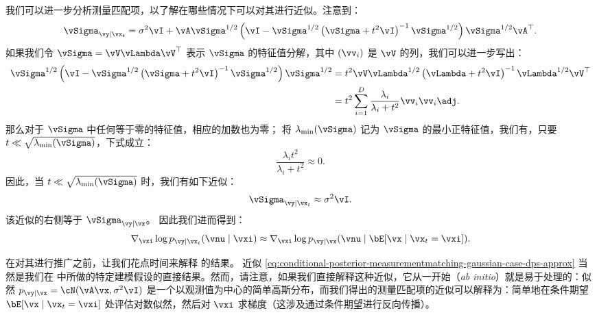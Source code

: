 \documentclass[../../book-main_zh.tex]{subfiles}
\begin{document}
\begin{example}
    我们可以进一步分析测量匹配项，以了解在哪些情况下可以对其进行近似。注意到：
    \begin{equation}
        \vSigma_{\vy \mid \vx_t}
        =
        \sigma^2 \vI + \vA\vSigma^{1/2} \left(
            \vI - \vSigma^{1/2}\left(
                \vSigma + t^2 \vI
            \right)^{-1}
            \vSigma^{1/2}
        \right)\vSigma^{1/2}\vA^\top.
    \end{equation}
    如果我们令 $\vSigma = \vV \vLambda \vV^\top$ 表示 $\vSigma$ 的特征值分解，其中 $(\vv_i)$ 是 $\vV$ 的列，我们可以进一步写出：
    \begin{align}
        \vSigma^{1/2}\left(
            \vI - \vSigma^{1/2}\left(
                \vSigma + t^2 \vI
            \right)^{-1}
            \vSigma^{1/2}
        \right) \vSigma^{1/2}
        &=
        t^2 \vV \vLambda^{1/2}\left(
            \vLambda + t^2 \vI
        \right)^{-1}
        \vLambda^{1/2}
        \vV^\top
        \\
        &=
        t^2 \sum_{i=1}^D
        \frac{\lambda_i}{\lambda_i + t^2}
        \vv_i \vv_i\adj.
    \end{align}
    那么对于 $\vSigma$ 中任何等于零的特征值，相应的加数也为零；
    将 $\lambda_{\min}(\vSigma)$ 记为 $\vSigma$ 的最小正特征值，我们有，只要 $t \ll
    \sqrt{\lambda_{\min}(\vSigma)}$，下式成立：
    \begin{equation}
        \frac{\lambda_i t^2}{\lambda_i + t^2} \approx 0.
    \end{equation}
    因此，当 $t \ll \sqrt{\lambda_{\min}(\vSigma)}$ 时，我们有如下近似：
    \begin{equation}
        \vSigma_{\vy \mid \vx_t} \approx \sigma^2 \vI.
    \end{equation}
    该近似的右侧等于 $\vSigma_{\vy \mid \vx}$。
    因此我们进而得到：
    \begin{equation}
        \nabla_{\vxi} \log p_{\vy \mid \vx_t}(\vnu \mid \vxi)
        \approx
        \nabla_{\vxi} \log p_{\vy \mid \vx}(\vnu \mid \bE[\vx \mid
        \vx_t = \vxi]).
        \label{eq:conditional-posterior-measurementmatching-gaussian-case-dps-approx}
    \end{equation}

\end{example}

在对其进行推广之前，让我们花点时间来解释  的结果。
近似 \eqref{eq:conditional-posterior-measurementmatching-gaussian-case-dps-approx} 当然是我们在  中所做的特定建模假设的直接结果。然而，请注意，如果我们直接解释这种近似，它从一开始（\textit{ab initio}）就是易于处理的：似然 $p_{\vy \mid \vx} = \cN(\vA\vx, \sigma^2 \vI)$ 是一个以观测值为中心的简单高斯分布，而我们得出的测量匹配项的近似可以解释为：简单地在条件期望 $\bE[\vx \mid \vx_t = \vxi]$ 处评估对数似然，然后对 $\vxi$ 求梯度（这涉及通过条件期望进行反向传播）。
\end{document}
